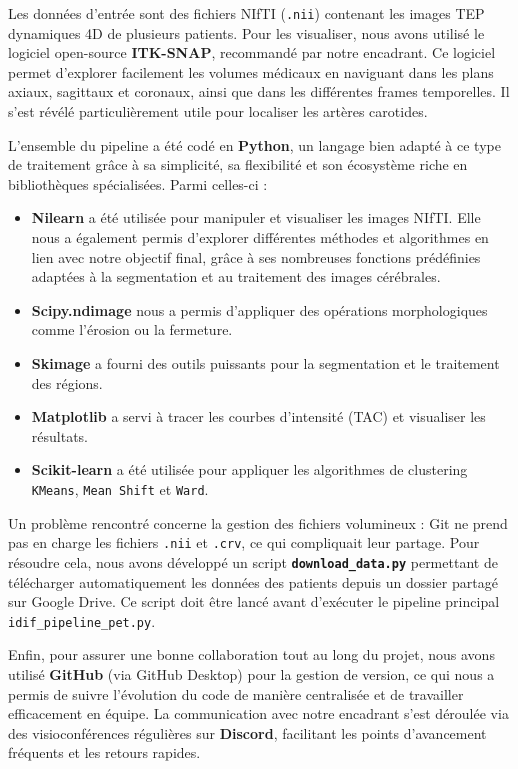 \documentclass{article}
\begin{document}
        Les données d’entrée sont des fichiers NIfTI (\texttt{.nii}) contenant les images TEP dynamiques 4D de plusieurs patients. Pour les visualiser, nous avons utilisé le logiciel open-source \textbf{ITK-SNAP}, recommandé par notre encadrant. Ce logiciel permet d’explorer facilement les volumes médicaux en naviguant dans les plans axiaux, sagittaux et coronaux, ainsi que dans les différentes frames temporelles. Il s’est révélé particulièrement utile pour localiser les artères carotides.
    
        L’ensemble du pipeline a été codé en \textbf{Python}, un langage bien adapté à ce type de traitement grâce à sa simplicité, sa flexibilité et son écosystème riche en bibliothèques spécialisées. Parmi celles-ci :
    
    \begin{itemize}
        \item \textbf{Nilearn} a été utilisée pour manipuler et visualiser les images NIfTI. Elle nous a également permis d’explorer différentes méthodes et algorithmes en lien avec notre objectif final, grâce à ses nombreuses fonctions prédéfinies adaptées à la segmentation et au traitement des images cérébrales.
        \item \textbf{Scipy.ndimage} nous a permis d’appliquer des opérations morphologiques comme l’érosion ou la fermeture.
        \item \textbf{Skimage} a fourni des outils puissants pour la segmentation et le traitement des régions.
        \item \textbf{Matplotlib} a servi à tracer les courbes d’intensité (TAC) et visualiser les résultats.
        \item \textbf{Scikit-learn} a été utilisée pour appliquer les algorithmes de clustering \texttt{KMeans}, \texttt{Mean Shift} et \texttt{Ward}.
    \end{itemize}
    
        Un problème rencontré concerne la gestion des fichiers volumineux : Git ne prend pas en charge les fichiers \texttt{.nii} et \texttt{.crv}, ce qui compliquait leur partage. Pour résoudre cela, nous avons développé un script \textbf{\texttt{download\_data.py}} permettant de télécharger automatiquement les données des patients depuis un dossier partagé sur Google Drive. Ce script doit être lancé avant d’exécuter le pipeline principal \texttt{idif\_pipeline\_pet.py}.
    
        Enfin, pour assurer une bonne collaboration tout au long du projet, nous avons utilisé \textbf{GitHub} (via GitHub Desktop) pour la gestion de version, ce qui nous a permis de suivre l’évolution du code de manière centralisée et de travailler efficacement en équipe. La communication avec notre encadrant s’est déroulée via des visioconférences régulières sur \textbf{Discord}, facilitant les points d’avancement fréquents et les retours rapides.
    
\end{document}
